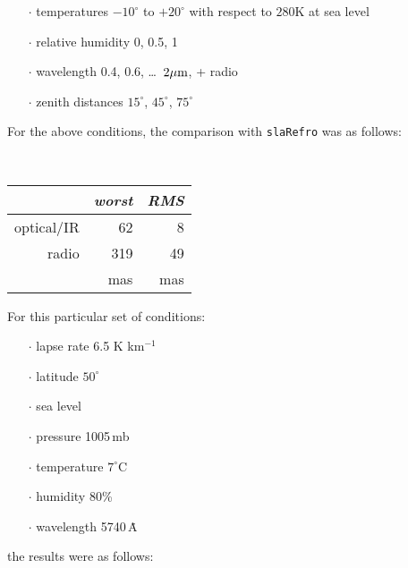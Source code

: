 \documentclass[11pt,fleqn,twoside]{article}
\renewcommand{\_}{{\tt\char'137}}     %
\begin{document}
{\begin{enumerate}
\begin{itemize}
                        in steps of $5$\%
        \item [$\cdot$] temperatures $-10^\circ$ to $+20^\circ$
                        with respect to $280$K at sea level
        \item [$\cdot$] relative humidity 0, 0.5, 1
        \item [$\cdot$] wavelength 0.4, 0.6, \ldots\ $2\mu{\rm m}$, + radio
        \item [$\cdot$] zenith distances $15^\circ$, $45^\circ$, $75^\circ$
        \end{itemize}
        For the above conditions, the comparison with {\tt slaRefro}
        was as follows:
 
        \vspace{2ex}
 
        ~~~~~~~~~~
        \begin{tabular}{|r|r|r|} \hline
              & {\it worst} & {\it RMS} \\ \hline
              optical/IR & 62 & 8 \\
              radio & 319 & 49 \\ \hline
              & mas & mas \\ \hline
        \end{tabular}
 
        \vspace{3ex}
 
        For this particular set of conditions:
        \begin{itemize}
        \item [$\cdot$] lapse rate 6.5 K km$^{-1}$
        \item [$\cdot$] latitude $50^\circ$
        \item [$\cdot$] sea level
        \item [$\cdot$] pressure 1005\,mb
        \item [$\cdot$] temperature $7^\circ$C
        \item [$\cdot$] humidity 80\%
        \item [$\cdot$] wavelength 5740\,\.{A}
        \end{itemize}
        the results were as follows:
 
        \vspace{2ex}
 

\end{enumerate}}
\end{document}
